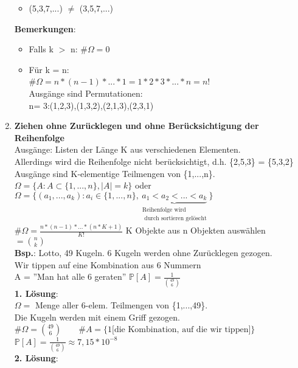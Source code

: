 \begin{enumerate}
\begin{itemize}
		\item (5,3,7,...) $\neq$ (3,5,7,...)
	\end{itemize}
\textbf{Bemerkungen}: 
\begin{itemize}
	\item Falls k $>$ n: \#$\Omega = 0$
	\item Für k = n:\\
	\#$\Omega = n*(n-1)*...*1 = 1*2*3*...*n = n!$\\Ausgänge sind Permutationen:\\n= 3:(1,2,3),(1,3,2),(2,1,3),(2,3,1)
\end{itemize}
	\item \textbf{Ziehen ohne Zurücklegen und ohne Berücksichtigung der Reihenfolge}\\
	Ausgänge: Listen der Länge K aus verschiedenen Elementen.\\
	Allerdings wird die Reihenfolge nicht berücksichtigt, d.h. \{2,5,3\} = \{5,3,2\}\smallskip\\
	Ausgänge sind K-elementige Teilmengen von \{1,...,n\}.\\
	$\Omega = \{A:A\subset\{1,...,n\},|A| = k\}$ oder \\
	$\Omega = \{(a_1,...,a_k):a_i \in \{1,...,n\},\underbrace{a_1<a_2<...<a_k}_{\substack{\text{Reihenfolge wird}\\\text{ durch sortieren gelöscht}}} \}$\medskip\\
	\#$\Omega = \frac{n*(n-1)*...*(n*K+1)}{K!}$ \hspace{0.5cm}K Objekte aus n Objekten auswählen\smallskip\\
	 $ = \binom{n}{k}$\medskip\\
	 \textbf{Bsp.}: Lotto, 49 Kugeln. 6 Kugeln werden ohne Zurücklegen gezogen.\\ 
	 Wir tippen auf eine Kombination aus 6 Nummern\smallskip\\
	 A = ''Man hat alle 6 geraten'' $\mathds{P}[A] = \frac{1}{\binom{49}{6}}$\medskip\\
	 \textbf{1. Lösung}:\\
	 $\Omega = $ Menge aller 6-elem. Teilmengen von \{1,...,49\}. \\
	 Die Kugeln werden mit einem Griff gezogen.\medskip\\
	 \#$\Omega = \binom{49}{6} \qquad \#A = \{1 \text{[die Kombination, auf die wir tippen]}\}$\\
	 $\mathds{P}[A] = \frac{1}{\binom{49}{6}} \approx 7,15*10^{-8}$\medskip\\
	 \textbf{2. Lösung}:\\

\end{enumerate}
